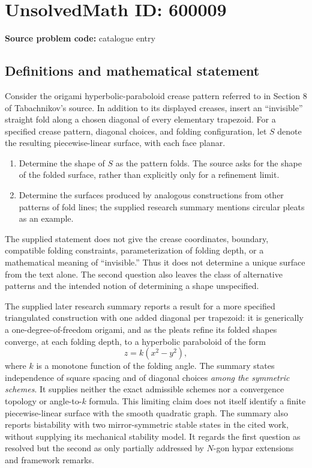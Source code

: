 \documentclass[11pt]{article}
\begin{document}
\section*{UnsolvedMath ID: 600009}
\textbf{Source problem code:} catalogue entry
\subsection{Definitions and mathematical statement}
Consider the origami hyperbolic-paraboloid crease pattern referred to in Section 8 of Tabachnikov's source. In addition to its displayed creases, insert an ``invisible'' straight fold along a chosen diagonal of every elementary trapezoid. For a specified crease pattern, diagonal choices, and folding configuration, let $S$ denote the resulting piecewise-linear surface, with each face planar.
\begin{enumerate}
\item Determine the shape of $S$ as the pattern folds. The source asks for the shape of the folded surface, rather than explicitly only for a refinement limit.
\item Determine the surfaces produced by analogous constructions from other patterns of fold lines; the supplied research summary mentions circular pleats as an example.
\end{enumerate}
The supplied statement does not give the crease coordinates, boundary, compatible folding constraints, parameterization of folding depth, or a mathematical meaning of ``invisible.'' Thus it does not determine a unique surface from the text alone. The second question also leaves the class of alternative patterns and the intended notion of determining a shape unspecified.

The supplied later research summary reports a result for a more specified triangulated construction with one added diagonal per trapezoid: it is generically a one-degree-of-freedom origami, and as the pleats refine its folded shapes converge, at each folding depth, to a hyperbolic paraboloid of the form
\[
z=k(x^2-y^2),
\]
where $k$ is a monotone function of the folding angle. The summary states independence of square spacing and of diagonal choices \emph{among the symmetric schemes}. It supplies neither the exact admissible schemes nor a convergence topology or angle-to-$k$ formula. This limiting claim does not itself identify a finite piecewise-linear surface with the smooth quadratic graph. The summary also reports bistability with two mirror-symmetric stable states in the cited work, without supplying its mechanical stability model. It regards the first question as resolved but the second as only partially addressed by $N$-gon hypar extensions and framework remarks.
\end{document}
